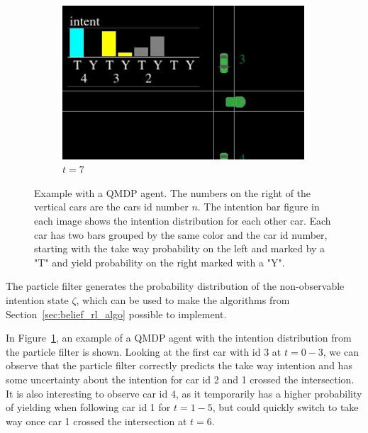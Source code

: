 \begin{figure}[!t]
\begin{subfigure}[b]{0.24\textwidth}
         \includegraphics[width=0.99\textwidth]{figures/intent_distribution/screenshot_9.jpeg}
         \caption{$t=7$}
     \end{subfigure}
     
    \centering
        \caption{Example with a QMDP agent. 
        The numbers on the right of the vertical cars are the cars id number $n$. The intention bar figure in each image shows the intention distribution for each other car. Each car has two bars grouped by the same color and the car id number, starting with the take way probability on the left and marked by a "T" and yield probability on the right marked with a "Y".}
    \label{fig:qmdp_screenshot}
\end{figure}
The particle filter generates the probability distribution of the non-observable intention state $\zeta$, which can be used to make the algorithms from Section~\ref{sec:belief_rl_algo} possible to implement. 

In Figure~\ref{fig:qmdp_screenshot}, an example of a QMDP agent with the intention distribution from the particle filter is shown. Looking at the first car with id 3 at $t=0-3$, we can observe that the particle filter correctly predicts the take way intention and has some uncertainty about the intention for car id 2 and 1 crossed the intersection. 
It is also interesting to observe car id 4, as it temporarily has a higher probability of yielding when following car id 1 for $t=1-5$, but could quickly switch to take way once car 1 crossed the intersection at $t=6$. 

